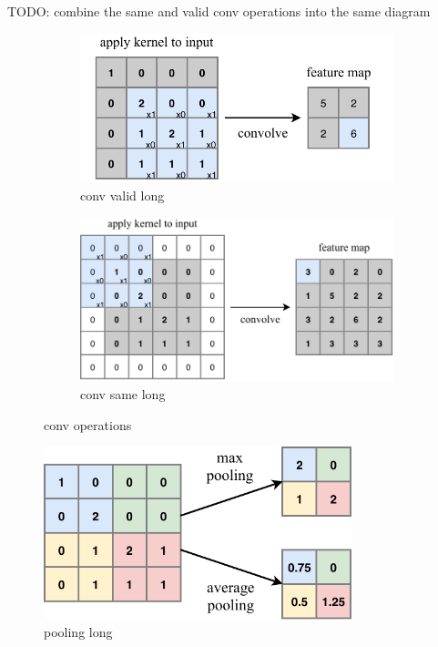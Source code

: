 TODO: combine the same and valid conv operations into the same diagram
\begin{figure} %
    \centering
    \begin{subfigure}[b]{0.71\textwidth}
        \centering
        \includegraphics[width=\textwidth]{diagrams/7-cvn/conv_valid.pdf}
        \caption{conv valid long}
        \label{fig:conv_valid}
    \end{subfigure}
    \hfill
    \begin{subfigure}[b]{0.9\textwidth}
        \centering
        \includegraphics[width=\textwidth]{diagrams/7-cvn/conv_same.pdf}
        \caption{conv same long}
        \label{fig:conv_same}
    \end{subfigure}
    \caption{conv operations}
    \label{fig:conv_operations}
\end{figure}


\begin{figure} %
    \includegraphics[width=0.8\textwidth]{diagrams/7-cvn/pooling.pdf}
    \caption[pooling short]
    {pooling long}
    \label{fig:pooling}
\end{figure}


